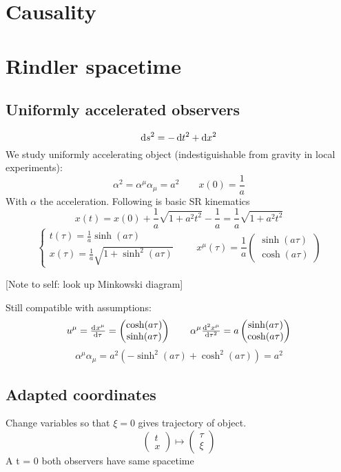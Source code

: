 \section{Causality}



\section{Rindler spacetime}
\subsection{Uniformly accelerated observers}
\[ \operatorname{d \!}{s}^2 = - \operatorname{d \!}{t}^2 + \operatorname{d \!}{x}^2 \]
We study uniformly accelerating object (indestiguishable from gravity in local experiments):
\[ \alpha^2 = \alpha^\mu\alpha_\mu = a^2 \qquad x(0) = \frac{1}{a} \]
With $\alpha$ the acceleration.
Following is basic SR kinematics
\[x(t) = x(0) + \frac{1}{a} \sqrt{1+a^2t^2}- \frac{1}{a} = \frac{1}{a} \sqrt{1+a^2t^2}\]
\[ \begin{cases}
t(\tau) = \frac{1}{a} \sinh(a\tau) \\
x(\tau) = \frac{1}{a} \sqrt{1+\sinh^2(a\tau)}
\end{cases} \qquad x^\mu(\tau) = \frac{1}{a} \begin{pmatrix}
\sinh(a\tau) \\ \cosh(a\tau)
\end{pmatrix}\]

[Note to self: look up Minkowski diagram]

Still compatible with assumptions:
\[ u^\mu = \od{x^\mu}{\tau} = \begin{pmatrix}
\cosh(a\tau) \\ \sinh(a\tau)
\end{pmatrix} \qquad \alpha^\mu \od[2]{x^\mu}{\tau} = a \begin{pmatrix}
\sinh(a\tau) \\ \cosh(a\tau)
\end{pmatrix} \]
\[\alpha^\mu\alpha_\mu = a^2 (-\sinh^2(a\tau)+\cosh^2(a\tau)) = a^2\]

\subsection{Adapted coordinates}
Change variables so that $\xi = 0$ gives trajectory of object.
\[ \begin{pmatrix}
t \\ x
\end{pmatrix} \mapsto \begin{pmatrix}
\tau \\ \xi
\end{pmatrix} \]
A t = 0 both observers have same spacetime

